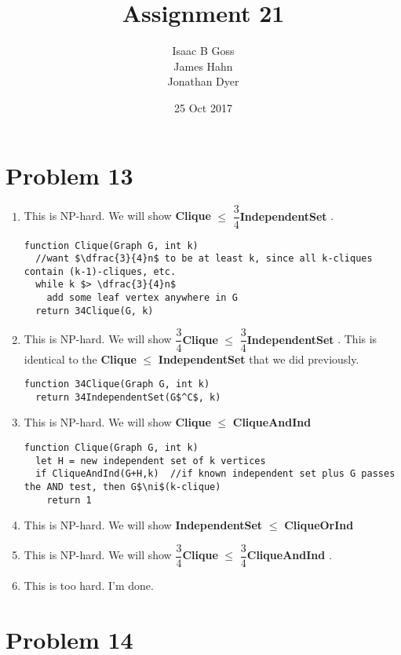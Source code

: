 \documentclass{article}
\author{Isaac B Goss\\ James Hahn\\ Jonathan Dyer}
\title{Assignment 21}
\date{25 Oct 2017}
\providecommand{\prob}[1]{\section*{Problem #1}}
\providecommand{\reducible}[2]{
  \textbf{#1} $\leq$ \textbf{#2}
}
\begin{document}
\maketitle

\prob{13}
\begin{enumerate}[label=(\alph*)]
 \item This is NP-hard. We will show \reducible{Clique}{$\dfrac{3}{4}$IndependentSet}.
       \begin{lstlisting}
function Clique(Graph G, int k)
  //want $\dfrac{3}{4}n$ to be at least k, since all k-cliques contain (k-1)-cliques, etc.
  while k $> \dfrac{3}{4}n$
    add some leaf vertex anywhere in G
  return 34Clique(G, k)
 \end{lstlisting}

 \item This is NP-hard. We will show \reducible{$\dfrac{3}{4}$Clique}{$\dfrac{3}{4}$IndependentSet}. This is identical to the \reducible{Clique}{IndependentSet} that we did previously.
       \begin{lstlisting}
function 34Clique(Graph G, int k)
  return 34IndependentSet(G$^C$, k)
 \end{lstlisting}

 \item This is NP-hard. We will show \reducible{Clique}{CliqueAndInd}
       \begin{lstlisting}
function Clique(Graph G, int k)
  let H = new independent set of k vertices
  if CliqueAndInd(G+H,k)  //if known independent set plus G passes the AND test, then G$\ni$(k-clique)
    return 1
 \end{lstlisting}

 \item This is NP-hard. We will show  \reducible{IndependentSet}{CliqueOrInd}

 \item This is NP-hard. We will show \reducible{$\dfrac{3}{4}$Clique}{$\dfrac{3}{4}$CliqueAndInd}.

 \item This is too hard. I'm done.
\end{enumerate}


\prob{14}
\end{document}
